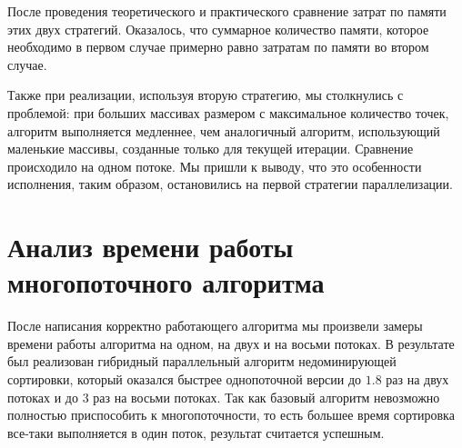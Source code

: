После проведения теоретического и практического сравнение затрат по памяти этих двух стратегий. Оказалось, что суммарное количество памяти, которое необходимо в первом случае примерно равно затратам по памяти во втором случае. 

Также при реализации, используя вторую стратегию, мы столкнулись с проблемой: при больших массивах размером с максимальное количество точек, алгоритм выполняется медленнее, чем аналогичный алгоритм, использующий маленькие массивы, созданные только для текущей итерации. Сравнение происходило на одном потоке. Мы пришли к выводу, что это особенности исполнения, таким образом, остановились на первой стратегии параллелизации. 

\section{Анализ времени работы многопоточного алгоритма}

После написания корректно работающего алгоритма мы произвели замеры времени работы алгоритма на одном, на двух и на восьми потоках. В результате был реализован гибридный параллельный алгоритм недоминирующей сортировки, который оказался быстрее однопоточной версии до $1.8$ раз на двух потоках и до $3$ раз на восьми потоках. Так как базовый алгоритм невозможно полностью приспособить к многопоточности, то есть большее время сортировка все-таки выполняется в один поток, результат считается успешным.
